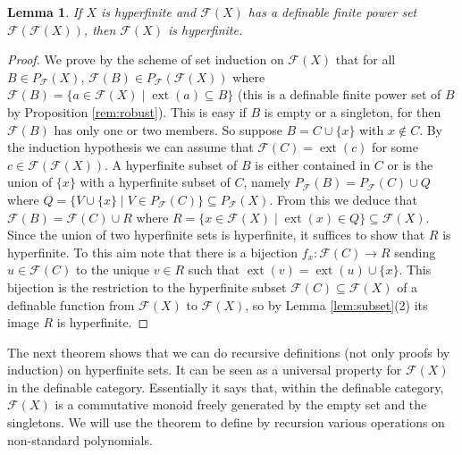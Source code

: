 \documentclass{amsart}
\newcommand{\ca}{\mathcal}
\newcommand{\nin}{\not \in}
\theoremstyle{plain}
\newtheorem{lem}[thm]{Lemma}
\theoremstyle{definition}
\newcommand{\F}{\mathcal{F}}
\newcommand{\pF}{P_{\ca F}}
\newcommand{\ext}[1]{\operatorname{ext}(#1)}
\begin{document}
\begin{lem} \label{lem:finiteness of powers}
If $X$ is hyperfinite and $\F(X)$ has a definable finite power set $\F(\F(X))$, then $\F(X)$ is hyperfinite.  
\end{lem}
\begin{proof} 
We prove by the scheme of set induction on $\F(X)$ that for all $B\in \pF(X)$, $\F(B) \in \pF(\F(X))$ where $\F(B) = \{a\in \F(X) \mid \ext a \subseteq B\}$ (this is a definable finite power set of $B$ by Proposition \ref{rem:robust}). This is easy if $B$ is empty or a singleton, for then $\F(B)$ has only one or two members. So suppose $B = C \cup \{x\}$ with $x\nin C$. By the induction hypothesis we can assume that  $\F(C) = \ext c$ for some $c \in \F(\F(X))$. A hyperfinite subset of $B$ is either contained in $C$ or is the union of $\{x\}$ with a hyperfinite subset of $C$, namely $\pF(B) = \pF (C) \cup Q$ where $Q = \{V\cup \{x\} \mid V \in \pF(C)\} \subseteq \pF(X)$. From this we deduce that $\F(B) = \F(C) \cup R$ where $R = \{x\in \F(X) \mid \ext x \in Q\} \subseteq \F(X)$. Since the union of two hyperfinite sets is hyperfinite, it suffices to show that $R$ is hyperfinite. To this aim note that there is a bijection $f_x: \F(C)\to R$ sending $u\in \F(C)$ to the unique $v \in R$ such that $\ext v = \ext u \cup \{x\}$. This bijection is the restriction to the hyperfinite subset $\F(C) \subseteq \F(X)$ of a definable function from $\F(X)$ to $\F(X)$, so by Lemma \ref{lem:subset}(2) its image $R$ is hyperfinite. 
\end{proof}

The next theorem shows that we can do recursive definitions (not only proofs by induction) on hyperfinite sets. It can be seen as a universal property for $\F(X)$ in the definable category. Essentially it says that, within the definable category, $\F(X)$ is a commutative monoid freely generated by the empty set and the singletons. We will use the theorem to define by recursion various operations on non-standard polynomials. 
\end{document}
